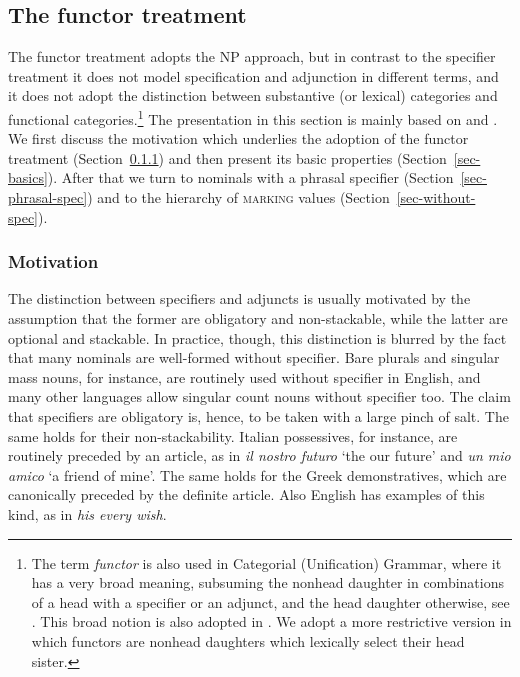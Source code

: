 \documentclass[output=paper
                ,modfonts
                ,nonflat
	        ,collection
	        ,collectionchapter
	        ,collectiontoclongg
 	        ,biblatex
                ,babelshorthands
                ,newtxmath
                ,draftmode
                ,colorlinks, citecolor=brown
]{./langsci/langscibook}
\begin{document}
\subsection{The functor treatment} 
\label{funct}


The functor treatment adopts the NP approach, but in contrast to the specifier treatment 
it does not model specification and adjunction in different terms, and it does not adopt 
the distinction between substantive (or lexical) categories and functional 
categories.\footnote{The term \emph{functor} is also used in Categorial (Unification) Grammar, 
where it has a very broad meaning, subsuming the nonhead daughter in combinations of a 
head with a specifier or an adjunct, and the head daughter otherwise, 
see \citet{Bouma88}. This broad notion is also adopted in 
\citet{Reape94}. We adopt a more restrictive version in which functors 
are nonhead daughters which lexically select their head sister.}  
The presentation in this section is mainly based on \citet{VanEynde06} 
and \citet{Allegranza06}. We first discuss the motivation which underlies the adoption 
of the functor treatment (Section~\ref{motiv}) and then present its basic
properties (Section~\ref{sec-basics}). After that we turn to nominals with a 
phrasal specifier (Section~\ref{sec-phrasal-spec}) 
and to the hierarchy of \textsc{marking} values (Section~\ref{sec-without-spec}).    


\subsubsection{Motivation} 
\label{motiv}


The distinction between specifiers and adjuncts is usually motivated by 
the assumption that the former are obligatory and non-stackable, while the latter  
are optional and stackable. In practice, though, this distinction 
is blurred by the fact that many nominals are well-formed without specifier.
Bare plurals and singular mass nouns, for instance, are routinely used without 
specifier in English, and many other languages allow singular count nouns without 
specifier too. The claim that specifiers are obligatory is, hence, to be taken 
with a large pinch of salt. The same holds for their non-stackability. 
Italian possessives, for instance, are routinely preceded by an article, as in 
\emph{il nostro futuro} `the our future' and \emph{un mio amico} `a friend of mine'.     
The same holds for the Greek demonstratives, which are canonically preceded by the 
definite article. Also English has examples of this kind, as in \emph{his every wish}.    
\end{document}
